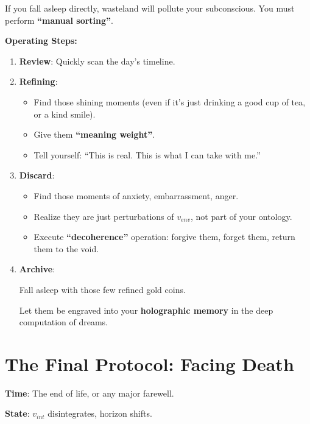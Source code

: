 If you fall asleep directly, wasteland will pollute your subconscious. You must perform \textbf{``manual sorting''}.

\textbf{Operating Steps:}

\begin{enumerate}
\item \textbf{Review}: Quickly scan the day's timeline.

\item \textbf{Refining}:

    \begin{itemize}
    \item Find those shining moments (even if it's just drinking a good cup of tea, or a kind smile).

    \item Give them \textbf{``meaning weight''}.

    \item Tell yourself: ``This is real. This is what I can take with me.''
    \end{itemize}

\item \textbf{Discard}:

    \begin{itemize}
    \item Find those moments of anxiety, embarrassment, anger.

    \item Realize they are just perturbations of $v_{env}$, not part of your ontology.

    \item Execute \textbf{``decoherence''} operation: forgive them, forget them, return them to the void.
    \end{itemize}

\item \textbf{Archive}:

    Fall asleep with those few refined gold coins.

    Let them be engraved into your \textbf{holographic memory} in the deep computation of dreams.
\end{enumerate}

\section{The Final Protocol: Facing Death}

\textbf{Time}: The end of life, or any major farewell.

\textbf{State}: $v_{int}$ disintegrates, horizon shifts.

